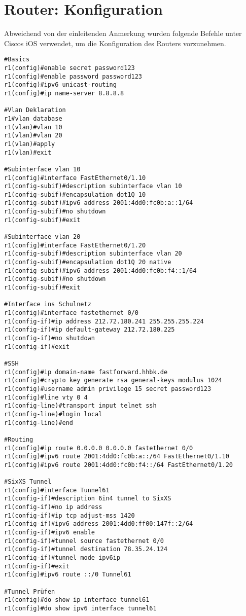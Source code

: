 \section{Router: Konfiguration}

Abweichend von der einleitenden Anmerkung wurden folgende Befehle unter Ciscos iOS verwendet, um die Konfiguration des Routers vorzunehmen.

\begin{lstlisting}[numbers=none]
#Basics
r1(config)#enable secret password123
r1(config)#enable password password123
r1(config)#ipv6 unicast-routing
r1(config)#ip name-server 8.8.8.8

#Vlan Deklaration
r1#vlan database 
r1(vlan)#vlan 10
r1(vlan)#vlan 20
r1(vlan)#apply
r1(vlan)#exit

#Subinterface vlan 10
r1(config)#interface FastEthernet0/1.10
r1(config-subif)#description subinterface vlan 10
r1(config-subif)#encapsulation dot1Q 10
r1(config-subif)#ipv6 address 2001:4dd0:fc0b:a::1/64
r1(config-subif)#no shutdown
r1(config-subif)#exit

#Subinterface vlan 20
r1(config)#interface FastEthernet0/1.20
r1(config-subif)#description subinterface vlan 20
r1(config-subif)#encapsulation dot1Q 20 native
r1(config-subif)#ipv6 address 2001:4dd0:fc0b:f4::1/64
r1(config-subif)#no shutdown
r1(config-subif)#exit

#Interface ins Schulnetz
r1(config)#interface fastethernet 0/0
r1(config-if)#ip address 212.72.180.241 255.255.255.224
r1(config-if)#ip default-gateway 212.72.180.225
r1(config-if)#no shutdown
r1(config-if)#exit

#SSH
r1(config)#ip domain-name fastforward.hhbk.de
r1(config)#crypto key generate rsa general-keys modulus 1024
r1(config)#username admin privilege 15 secret password123
r1(config)#line vty 0 4
r1(config-line)#transport input telnet ssh
r1(config-line)#login local
r1(config-line)#end

#Routing
r1(config)#ip route 0.0.0.0 0.0.0.0 fastethernet 0/0
r1(config)#ipv6 route 2001:4dd0:fc0b:a::/64 FastEthernet0/1.10
r1(config)#ipv6 route 2001:4dd0:fc0b:f4::/64 FastEthernet0/1.20

#SixXS Tunnel
r1(config)#interface Tunnel61
r1(config-if)#description 6in4 tunnel to SixXS
r1(config-if)#no ip address
r1(config-if)#ip tcp adjust-mss 1420
r1(config-if)#ipv6 address 2001:4dd0:ff00:147f::2/64
r1(config-if)#ipv6 enable
r1(config-if)#tunnel source fastethernet 0/0
r1(config-if)#tunnel destination 78.35.24.124
r1(config-if)#tunnel mode ipv6ip
r1(config-if)#exit
r1(config)#ipv6 route ::/0 Tunnel61

#Tunnel Prüfen
r1(config)#do show ip interface tunnel61
r1(config)#do show ipv6 interface tunnel61
\end{lstlisting}

